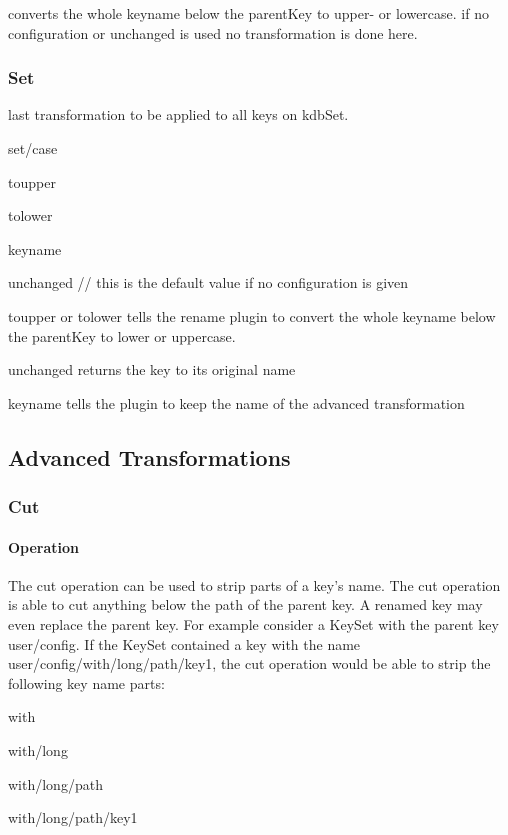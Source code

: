 converts the whole keyname below the parent\+Key to upper-\/ or lowercase. if no configuration or {\ttfamily unchanged} is used no transformation is done here.

\subsubsection*{Set}

last transformation to be applied to all keys on kdb\+Set.

{\ttfamily set/case}


\begin{DoxyItemize}
\item toupper
\item tolower
\item keyname
\item unchanged // this is the default value if no configuration is given
\end{DoxyItemize}

{\ttfamily toupper} or {\ttfamily tolower} tells the rename plugin to convert the whole keyname below the parent\+Key to lower or uppercase.

{\ttfamily unchanged} returns the key to its original name

{\ttfamily keyname} tells the plugin to keep the name of the advanced transformation

\subsection*{Advanced Transformations}

\subsubsection*{Cut}

\paragraph*{Operation}

The cut operation can be used to strip parts of a key’s name. The cut operation is able to cut anything below the path of the parent key. A renamed key may even replace the parent key. For example consider a Key\+Set with the parent key {\ttfamily user/config}. If the Key\+Set contained a key with the name {\ttfamily user/config/with/long/path/key1}, the cut operation would be able to strip the following key name parts\+:


\begin{DoxyItemize}
\item with
\item with/long
\item with/long/path
\item with/long/path/key1
\end{DoxyItemize}

